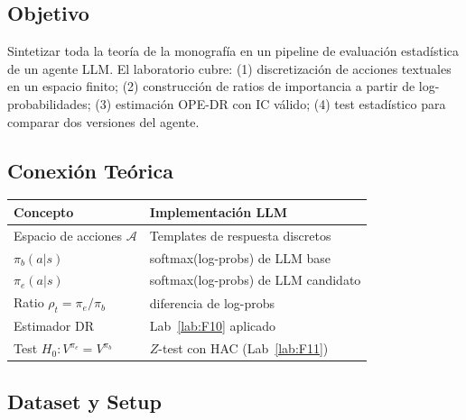 \bigskip

\subsection*{Objetivo}

Sintetizar toda la teoría de la monografía en un pipeline de evaluación
estadística de un agente LLM. El laboratorio cubre: (1) discretización de
acciones textuales en un espacio finito; (2) construcción de ratios de
importancia a partir de log-probabilidades; (3) estimación OPE-DR con IC
válido; (4) test estadístico para comparar dos versiones del agente.

\subsection*{Conexión Teórica}

\begin{center}
\small
\begin{tabular}{ll}
\toprule
\textbf{Concepto} & \textbf{Implementación LLM} \\
\midrule
Espacio de acciones $\mathcal{A}$ & Templates de respuesta discretos \\
$\pi_b(a|s)$ & softmax(log-probs) de LLM base \\
$\pi_e(a|s)$ & softmax(log-probs) de LLM candidato \\
Ratio $\rho_t = \pi_e/\pi_b$ & diferencia de log-probs \\
Estimador DR & Lab~\ref{lab:F10} aplicado \\
Test $H_0: V^{\pi_e} = V^{\pi_b}$ & $Z$-test con HAC (Lab~\ref{lab:F11}) \\
\bottomrule
\end{tabular}
\end{center}

\subsection*{Dataset y Setup}

